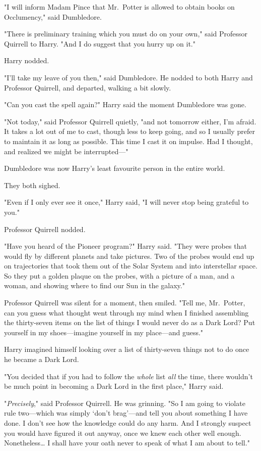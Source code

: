"I will inform Madam Pince that Mr.~Potter is allowed to obtain books on
Occlumency," said Dumbledore.

"There is preliminary training which you must do on your own," said Professor
Quirrell to Harry. "And I do suggest that you hurry up on it."

Harry nodded.

"I'll take my leave of you then," said Dumbledore. He nodded to both Harry and
Professor Quirrell, and departed, walking a bit slowly.

"Can you cast the spell again?" Harry said the moment Dumbledore was gone.

"Not today," said Professor Quirrell quietly, "and not tomorrow either, I'm
afraid. It takes a lot out of me to cast, though less to keep going, and so I
usually prefer to maintain it as long as possible. This time I cast it on
impulse. Had I thought, and realized we might be interrupted---"

Dumbledore was now Harry's least favourite person in the entire world.

They both sighed.

"Even if I only ever see it once," Harry said, "I will never stop being
grateful to you."

Professor Quirrell nodded.

"Have you heard of the Pioneer program?" Harry said. "They were probes that
would fly by different planets and take pictures. Two of the probes would end
up on trajectories that took them out of the Solar System and into interstellar
space. So they put a golden plaque on the probes, with a picture of a man, and
a woman, and showing where to find our Sun in the galaxy."

Professor Quirrell was silent for a moment, then smiled. "Tell me, Mr.~Potter,
can you guess what thought went through my mind when I finished assembling the
thirty-seven items on the list of things I would never do as a Dark Lord? Put
yourself in my shoes---imagine yourself in my place---and guess."

Harry imagined himself looking over a list of thirty-seven things not to do
once he became a Dark Lord.

"You decided that if you had to follow the \emph{whole} list \emph{all} the
time, there wouldn't be much point in becoming a Dark Lord in the first place,"
Harry said.

"\emph{Precisely}," said Professor Quirrell. He was grinning. "So I am going to
violate rule two---which was simply `don't brag'---and tell you about something
I have done. I don't see how the knowledge could do any harm. And I strongly
suspect you would have figured it out anyway, once we knew each other well
enough. Nonetheless{\ldots} I shall have your oath never to speak of what I am
about to tell."

